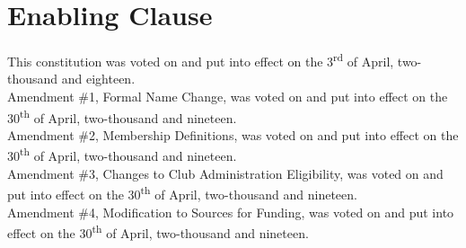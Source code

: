 \documentclass[english,11pt]{article}
\begin{document}
\section{Enabling Clause} \label{art:enabling}
This constitution was voted on and put into effect on the 3\textsuperscript{rd} of April, two-thousand and eighteen. \\

\noindent Amendment \#1, Formal Name Change, was voted on and put into effect on the 30\textsuperscript{th} of April, two-thousand and nineteen. \\

\noindent Amendment \#2, Membership Definitions, was voted on and put into effect on the 30\textsuperscript{th} of April, two-thousand and nineteen. \\

\noindent Amendment \#3, Changes to Club Administration Eligibility, was voted on and put into effect on the 30\textsuperscript{th} of April, two-thousand and nineteen. \\

\noindent Amendment \#4, Modification to Sources for Funding, was voted on and put into effect on the 30\textsuperscript{th} of April, two-thousand and nineteen.
\end{document}
